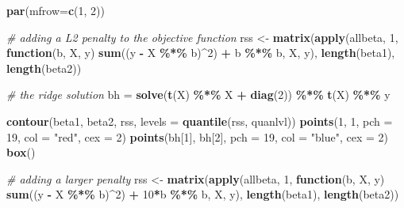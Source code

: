 \documentclass[
]{book}
\newenvironment{Shaded}{\begin{snugshade}}{\end{snugshade}}
\newcommand{\AttributeTok}[1]{\textcolor[rgb]{0.13,0.29,0.53}{#1}}
\newcommand{\CommentTok}[1]{\textcolor[rgb]{0.56,0.35,0.01}{\textit{#1}}}
\newcommand{\ControlFlowTok}[1]{\textcolor[rgb]{0.13,0.29,0.53}{\textbf{#1}}}
\newcommand{\DecValTok}[1]{\textcolor[rgb]{0.00,0.00,0.81}{#1}}
\newcommand{\FunctionTok}[1]{\textcolor[rgb]{0.13,0.29,0.53}{\textbf{#1}}}
\newcommand{\NormalTok}[1]{#1}
\newcommand{\OtherTok}[1]{\textcolor[rgb]{0.56,0.35,0.01}{#1}}
\newcommand{\SpecialCharTok}[1]{\textcolor[rgb]{0.81,0.36,0.00}{\textbf{#1}}}
\newcommand{\StringTok}[1]{\textcolor[rgb]{0.31,0.60,0.02}{#1}}
\theoremstyle{definition}
\theoremstyle{definition}
\theoremstyle{definition}
\theoremstyle{definition}
\theoremstyle{remark}
\begin{document}
\begin{Shaded}
\begin{Highlighting}[]
    \FunctionTok{par}\NormalTok{(}\AttributeTok{mfrow=}\FunctionTok{c}\NormalTok{(}\DecValTok{1}\NormalTok{, }\DecValTok{2}\NormalTok{))}

    \CommentTok{\# adding a L2 penalty to the objective function}
\NormalTok{    rss }\OtherTok{\textless{}{-}} \FunctionTok{matrix}\NormalTok{(}\FunctionTok{apply}\NormalTok{(allbeta, }\DecValTok{1}\NormalTok{, }\ControlFlowTok{function}\NormalTok{(b, X, y) }\FunctionTok{sum}\NormalTok{((y }\SpecialCharTok{{-}}\NormalTok{ X }\SpecialCharTok{\%*\%}\NormalTok{ b)}\SpecialCharTok{\^{}}\DecValTok{2}\NormalTok{) }\SpecialCharTok{+}\NormalTok{ b }\SpecialCharTok{\%*\%}\NormalTok{ b, X, y),}
                  \FunctionTok{length}\NormalTok{(beta1), }\FunctionTok{length}\NormalTok{(beta2))}
    
    \CommentTok{\# the ridge solution}
\NormalTok{    bh }\OtherTok{=} \FunctionTok{solve}\NormalTok{(}\FunctionTok{t}\NormalTok{(X) }\SpecialCharTok{\%*\%}\NormalTok{ X }\SpecialCharTok{+} \FunctionTok{diag}\NormalTok{(}\DecValTok{2}\NormalTok{)) }\SpecialCharTok{\%*\%} \FunctionTok{t}\NormalTok{(X) }\SpecialCharTok{\%*\%}\NormalTok{ y}
    
    \FunctionTok{contour}\NormalTok{(beta1, beta2, rss, }\AttributeTok{levels =} \FunctionTok{quantile}\NormalTok{(rss, quanlvl))}
    \FunctionTok{points}\NormalTok{(}\DecValTok{1}\NormalTok{, }\DecValTok{1}\NormalTok{, }\AttributeTok{pch =} \DecValTok{19}\NormalTok{, }\AttributeTok{col =} \StringTok{"red"}\NormalTok{, }\AttributeTok{cex =} \DecValTok{2}\NormalTok{)}
    \FunctionTok{points}\NormalTok{(bh[}\DecValTok{1}\NormalTok{], bh[}\DecValTok{2}\NormalTok{], }\AttributeTok{pch =} \DecValTok{19}\NormalTok{, }\AttributeTok{col =} \StringTok{"blue"}\NormalTok{, }\AttributeTok{cex =} \DecValTok{2}\NormalTok{)}
    \FunctionTok{box}\NormalTok{()}
    
    \CommentTok{\# adding a larger penalty}
\NormalTok{    rss }\OtherTok{\textless{}{-}} \FunctionTok{matrix}\NormalTok{(}\FunctionTok{apply}\NormalTok{(allbeta, }\DecValTok{1}\NormalTok{, }\ControlFlowTok{function}\NormalTok{(b, X, y) }\FunctionTok{sum}\NormalTok{((y }\SpecialCharTok{{-}}\NormalTok{ X }\SpecialCharTok{\%*\%}\NormalTok{ b)}\SpecialCharTok{\^{}}\DecValTok{2}\NormalTok{) }\SpecialCharTok{+} \DecValTok{10}\SpecialCharTok{*}\NormalTok{b }\SpecialCharTok{\%*\%}\NormalTok{ b, X, y),}
                  \FunctionTok{length}\NormalTok{(beta1), }\FunctionTok{length}\NormalTok{(beta2))}
    

\end{Highlighting}
\end{Shaded}
\end{document}
